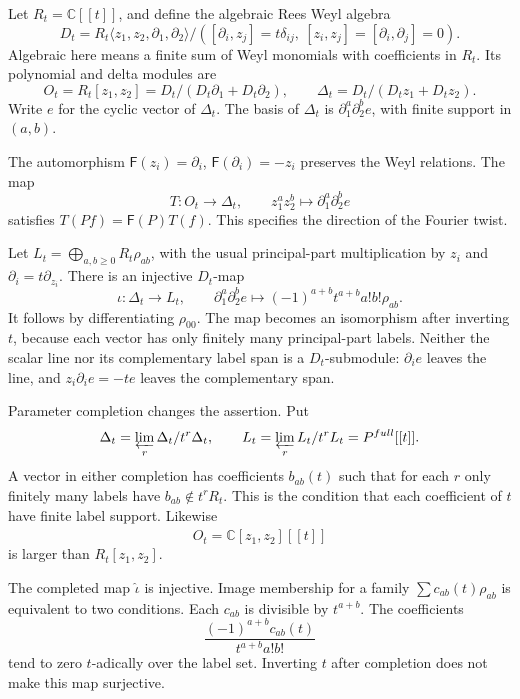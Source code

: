 Let $R_t=\mathbb C[[t]]$, and define the algebraic Rees Weyl
algebra
\[
 D_t=R_t\langle z_1,z_2,\partial_1,\partial_2\rangle/
 ([\partial_i,z_j]=t\delta_{ij},\ [z_i,z_j]=[\partial_i,\partial_j]=0).
\]
Algebraic here means a finite sum of Weyl monomials with
coefficients in $R_t$. Its polynomial and delta modules are
\[
 O_t=R_t[z_1,z_2]=D_t/(D_t\partial_1+D_t\partial_2),
 \qquad
 \Delta_t=D_t/(D_tz_1+D_tz_2).
\]
Write $e$ for the cyclic vector of $\Delta_t$. The basis of
$\Delta_t$ is $\partial_1^a\partial_2^be$, with finite support
in $(a,b)$.

The automorphism
$\mathsf F(z_i)=\partial_i$, $\mathsf F(\partial_i)=-z_i$
preserves the Weyl relations. The map
\[
 T:O_t\longrightarrow\Delta_t,
 \qquad z_1^az_2^b\longmapsto\partial_1^a\partial_2^be
\]
satisfies $T(Pf)=\mathsf F(P)T(f)$. This specifies the
direction of the Fourier twist.

Let $L_t=\bigoplus_{a,b\geq0}R_t\rho_{ab}$, with the usual
principal-part multiplication by $z_i$ and
$\partial_i=t\partial_{z_i}$. There is an injective $D_t$-map
\begin{equation}\label{mht:eq:fourier-lattice-map}
 \iota:\Delta_t\longrightarrow L_t,
 \qquad \partial_1^a\partial_2^be\longmapsto
       (-1)^{a+b}t^{a+b}a!b!\rho_{ab}.
\end{equation}
It follows by differentiating $\rho_{00}$. The map becomes
an isomorphism after inverting $t$, because each vector has
only finitely many principal-part labels. Neither the scalar
line nor its complementary label span is a $D_t$-submodule:
$\partial_i e$ leaves the line, and
$z_i\partial_i e=-te$ leaves the complementary span.

Parameter completion changes the assertion. Put
\[
 \widehat\Delta_t=\varprojlim_r\Delta_t/t^r\Delta_t,
 \qquad \widehat L_t=\varprojlim_r L_t/t^rL_t
                         =P^{\mathrm{full}}[[t]].
\]
A vector in either completion has coefficients $b_{ab}(t)$
such that for each $r$ only finitely many labels have
$b_{ab}\notin t^rR_t$. This is the condition that each
coefficient of $t$ have finite label support. Likewise
\[
 \widehat O_t=\mathbb C[z_1,z_2][[t]]
\]
is larger than $R_t[z_1,z_2]$.

\begin{proposition}\label{mht:prop:completed-fourier-image}
The completed map $\widehat\iota$ is injective. Image membership
for a family $\sum c_{ab}(t)\rho_{ab}$ is equivalent to two
conditions. Each $c_{ab}$ is divisible by $t^{a+b}$. The coefficients
\[
 \frac{(-1)^{a+b}c_{ab}(t)}{t^{a+b}a!b!}
\]
tend to zero $t$-adically over the label set. Inverting $t$
after completion does not make this map surjective.
\end{proposition}

